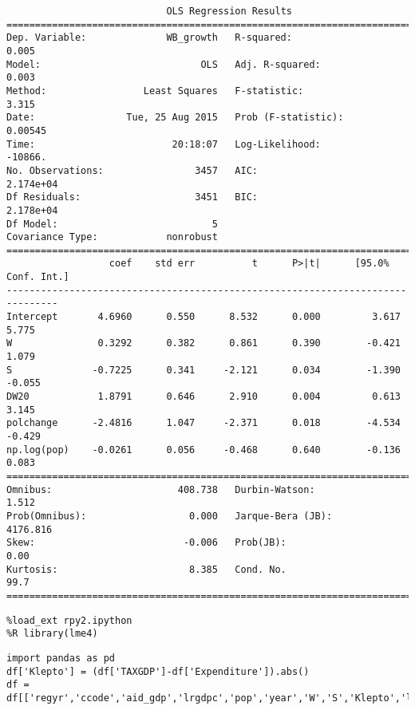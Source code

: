 \documentclass[12pt,fleqn]{article}\usepackage{common}
\begin{document}
\begin{verbatim}
                            OLS Regression Results                            
==============================================================================
Dep. Variable:              WB_growth   R-squared:                       0.005
Model:                            OLS   Adj. R-squared:                  0.003
Method:                 Least Squares   F-statistic:                     3.315
Date:                Tue, 25 Aug 2015   Prob (F-statistic):            0.00545
Time:                        20:18:07   Log-Likelihood:                -10866.
No. Observations:                3457   AIC:                         2.174e+04
Df Residuals:                    3451   BIC:                         2.178e+04
Df Model:                           5                                         
Covariance Type:            nonrobust                                         
===============================================================================
                  coef    std err          t      P>|t|      [95.0% Conf. Int.]
-------------------------------------------------------------------------------
Intercept       4.6960      0.550      8.532      0.000         3.617     5.775
W               0.3292      0.382      0.861      0.390        -0.421     1.079
S              -0.7225      0.341     -2.121      0.034        -1.390    -0.055
DW20            1.8791      0.646      2.910      0.004         0.613     3.145
polchange      -2.4816      1.047     -2.371      0.018        -4.534    -0.429
np.log(pop)    -0.0261      0.056     -0.468      0.640        -0.136     0.083
==============================================================================
Omnibus:                      408.738   Durbin-Watson:                   1.512
Prob(Omnibus):                  0.000   Jarque-Bera (JB):             4176.816
Skew:                          -0.006   Prob(JB):                         0.00
Kurtosis:                       8.385   Cond. No.                         99.7
==============================================================================
\end{verbatim}


\begin{verbatim}
%load_ext rpy2.ipython
%R library(lme4)
\end{verbatim}

\begin{verbatim}
import pandas as pd
df['Klepto'] = (df['TAXGDP']-df['Expenditure']).abs()
df = df[['regyr','ccode','aid_gdp','lrgdpc','pop','year','W','S','Klepto','laglrgdpc']]
\end{verbatim}
\end{document}
